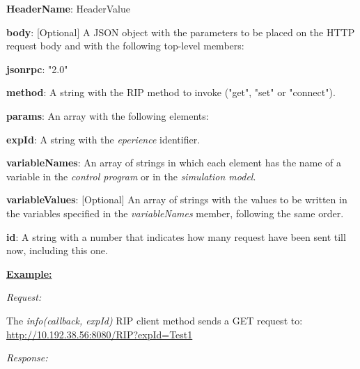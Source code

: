 \begin{myEnumerate}
\begin{myEnumerate}
\begin{myEnumerate}
\begin{myEnumerate}
                    \begin{myEnumerate}
                        \item \textbf{HeaderName}: HeaderValue
                    \end{myEnumerate}
                    \item \textbf{body}: [Optional] A JSON object with the parameters to be placed on the HTTP request body and with the following top-level members:
                    \begin{myEnumerate}
                        \item \textbf{jsonrpc}: "2.0"
                        \item \textbf{method}: A string with the RIP method to invoke ("get", "set" or "connect"). %
                        \item \textbf{params}: An array with the following elements:
                        \begin{myEnumerate}
                            \item \textbf{expId}: A string with the \textit{eperience} identifier.
                            \item \textbf{variableNames}: An array of strings in which each element has the name of a variable in the \textit{control program} or in the \textit{simulation model}.
                            \item \textbf{variableValues}: [Optional] An array of strings with the values to be written in the variables specified in the \textit{variableNames} member, following the same order.
                        \end{myEnumerate}
                        \item \textbf{id}: A string with a number that indicates how many request have been sent till now, including this one.
                    \end{myEnumerate}
            \end{myEnumerate}
        \end{myEnumerate}
    \end{myEnumerate}
\end{myEnumerate}

\textbf{\underline{Example:}}

\textit{Request:}

The \textit{info(callback, expId)} RIP client method sends a GET request to: \url{http://10.192.38.56:8080/RIP?expId=Test1}

\textit{Response:}

